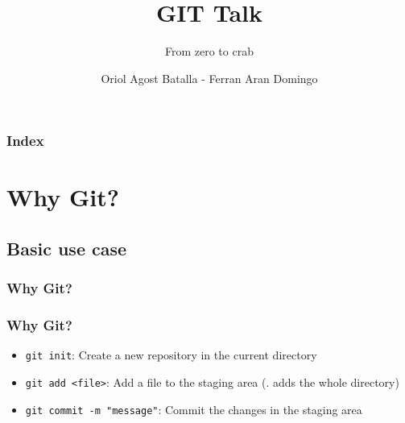 \documentclass{beamer}
\title{GIT Talk}
\subtitle{From zero to \xcancel{hero} crab}
\author{Oriol Agost Batalla - Ferran Aran Domingo}
\institute{Lleidahack}
\date{\displaydate{date}}
\begin{document}
    \begin{frame}
        \maketitle
    \end{frame}

    \begin{frame}
        \frametitle{Index}
        \tableofcontents
    \end{frame}


    \section{Why Git?}\label{sec:why-git?}

    \subsection{Basic use case}\label{subsec:basic-use-case}
    \begin{frame}
        \frametitle{Why Git?}
        \begin{figure}[H]
            \centering
            \noindent
            \label{fig:figure}
        \end{figure}
    \end{frame}
    \begin{frame}
        \frametitle{Why Git?}
        \begin{itemize}
            \item \texttt{git init}: Create a new repository in the current directory
            \item \texttt{git add <file>}: Add a file to the staging area (. adds the whole directory)
            \item \texttt{git commit -m "message"}: Commit the changes in the staging area
        \end{itemize}
    \end{frame}
\end{document}
